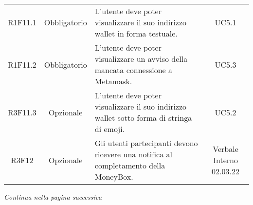 \begin{table}[H]
\begin{tabular}{c | c | p{6cm} | c}
        R1F11.1                                                           & Obbligatorio & L'utente deve poter visualizzare il suo indirizzo wallet\glo{} in forma testuale.                                & UC5.1                    \\
        R1F11.2                                                           & Obbligatorio & L'utente deve poter visualizzare un avviso della mancata connessione a Metamask\glo{}.                     & UC5.3                    \\
        R3F11.3                                                           & Opzionale    & L'utente deve poter visualizzare il suo indirizzo wallet\glo{} sotto forma di stringa di emoji.                  & UC5.2                    \\
        R3F12                                                             & Opzionale    & Gli utenti partecipanti devono ricevere una notifica al completamento della MoneyBox\glo{}.                & Verbale Interno 02.03.22 \\
    \end{tabular}
\end{table}
\begin{center}
    \textit{\small Continua nella pagina successiva}
\end{center}
